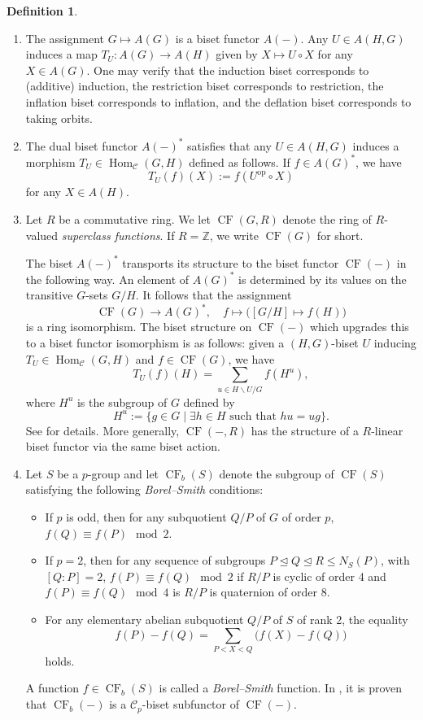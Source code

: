 \documentclass[]{amsart}
\newcommand{\Hom}{\operatorname{Hom}}
\newcommand{\op}{^{\operatorname{op}}}
\newcommand{\on}[1]{\operatorname{#1}}
\newcommand{\calC}{\mathcal{C}}
\newcommand{\bbZ}{\mathbb{Z}}
\newcommand{\CF}{\on{CF}}
\theoremstyle{remark}
\theoremstyle{definition}
\newtheorem{definition}[theorem]{Definition}
\begin{document}
	\begin{definition}  \label{def:class_fns_borel_smith_biset}
		\begin{enumerate}
			\item The assignment $G \mapsto A(G)$ is a biset functor $A(-)$. Any $U \in A(H,G)$ induces a map $T_U\colon A(G) \to A(H)$ given by $X \mapsto U \circ X $ for any $X \in A(G)$. One may verify that the induction biset corresponds to (additive) induction, the restriction biset corresponds to restriction, the inflation biset corresponds to inflation, and the deflation biset corresponds to taking orbits. 
			\item The dual biset functor $A(-)^*$ satisfies that any $U \in A(H,G)$ induces a morphism $T_U \in \Hom_\calC(G,H)$ defined as follows. If $f \in A(G)^*$, we have \[T_U(f)(X) := f(U\op \circ X)\] for any $X \in A(H)$. 
			\item Let $R$ be a commutative ring. We let $\CF(G,R)$ denote the ring of $R$-valued \emph{superclass functions}. If $R= \bbZ$, we write $\CF(G)$ for short.
			
			The biset $A(-)^*$ transports its structure to the biset functor $\on{CF}(-)$ in the following way. An element of $A(G)^*$ is determined by its values on the transitive $G$-sets $G/H$. It follows that the assignment \[\on{CF}(G) \to A(G)^*,\quad f \mapsto \big([G/H] \mapsto f(H)\big)\] is a ring isomorphism. 
			The biset structure on $\on{CF}(-)$ which upgrades this to a biset functor isomorphism is as follows:
			given a $(H,G)$-biset $U$ inducing $T_U \in \Hom_\calC(G,H)$ and $f \in \on{CF}(G)$, we have \[T_U(f)(H) = \sum_{u \in H\backslash U/G}f( H^u),\] where $H^u $ is the subgroup of $G$ defined by \[H^u := \{g \in G \mid \exists h\in H \text{ such that } hu = ug\}.\] See \cite[3.4]{BoYa07} for details. 
			More generally, $\CF(-, R)$ has the structure of a $R$-linear biset functor via the same biset action.
			\item Let $S$ be a $p$-group and let $\on{CF}_b(S)$ denote the subgroup of $\on{CF}(S)$ satisfying the following \emph{Borel--Smith} conditions:
			\begin{itemize}
				\item If $p$ is odd, then for any subquotient $Q/P$ of $G$ of order $p$, $f(Q) \equiv f(P) \mod 2$.
				\item If $p = 2$, then for any sequence of subgroups $P \trianglelefteq Q \trianglelefteq R \leq N_S(P)$, with $[Q:P] = 2$, $f(P) \equiv f(Q) \mod 2$ if $R/P$ is cyclic of order 4 and $f(P) \equiv f(Q) \mod 4$ is $R/P$ is quaternion of order 8.
				\item For any elementary abelian subquotient $Q/P$ of $S$ of rank 2, the equality \[f(P) - f(Q) = \sum_{P < X < Q} \big(f(X) - f(Q)\big)\] holds.
			\end{itemize}
			A function $f \in \on{CF}_b(S)$ is called a \emph{Borel--Smith} function. In \cite{BoYa07}, it is proven that $\on{CF}_b(-)$ is a $\calC_p$-biset subfunctor of $\on{CF}(-)$.
			

\end{enumerate}
\end{definition}
\end{document}
